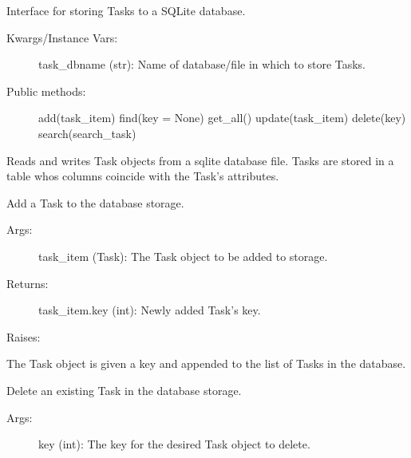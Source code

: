 \documentclass[letterpaper,10pt,english]{sphinxmanual}
\begin{document}
\begin{fulllineitems}
\label{index:storage.SQLiteStorage}
Interface for storing Tasks to a SQLite database.
\begin{description}
\item[{Kwargs/Instance Vars:}] \leavevmode
task\_dbname (str): Name of database/file in which to store Tasks.

\item[{Public methods:}] \leavevmode
add(task\_item)
find(key = None)
get\_all()
update(task\_item)
delete(key)
search(search\_task)

\end{description}

Reads and writes Task objects from a sqlite database file. Tasks are
stored in a table whos columns coincide with the Task's attributes.


\begin{fulllineitems}
\label{index:storage.SQLiteStorage.add}
Add a Task to the database storage.
\begin{description}
\item[{Args:}] \leavevmode
task\_item (Task): The Task object to be added to storage.

\item[{Returns:}] \leavevmode
task\_item.key (int): Newly added Task's key.

\end{description}

Raises:

The Task object is given a key and appended to the list of Tasks in
the database.

\end{fulllineitems}



\begin{fulllineitems}
\label{index:storage.SQLiteStorage.delete}
Delete an existing Task in the database storage.
\begin{description}
\item[{Args:}] \leavevmode
key (int): The key for the desired Task object to delete.


\end{description}
\end{fulllineitems}
\end{fulllineitems}
\end{document}
